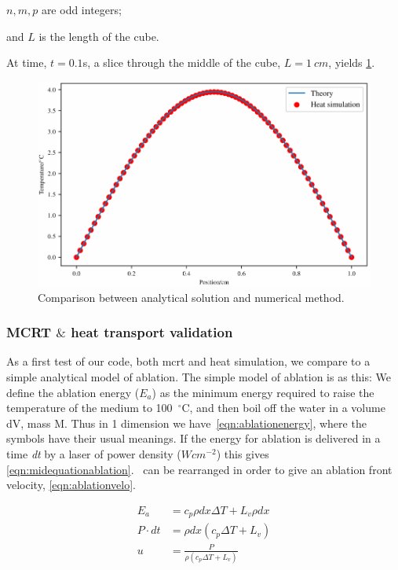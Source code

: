 	\indent $n,m,p$ are odd integers;
	
	\indent and $L$ is the length of the cube.
	
	\medskip
	
At time, $t=0.1$s, a slice through the middle of the cube, $L=1~cm$,  yields \cref{fig:validation-heat}.

\begin{figure}	
\vspace{-10pt}
	\centering
	\includegraphics[width=\columnwidth]{./ablation/images/validation.pdf}
	\caption{Comparison between analytical solution and numerical method.}
	\label{fig:validation-heat}
	\vspace{-10pt}
\end{figure}	

\subsubsection{MCRT $\&$ heat transport validation}

As a first test of our code, both \gls{mcrt} and heat simulation, we compare to a simple analytical model of ablation. The simple model of ablation is as this: We define the ablation energy ($E_a$) as the minimum energy required to raise the temperature of the medium to 100~$^{\circ}$C, and then boil off the water in a volume dV, mass M. Thus in 1 dimension we have~\cref{eqn:ablationenergy}, where the symbols have their usual meanings. If the energy for ablation is delivered in a time \textit{dt} by a laser of power density ($Wcm^{-2}$) this gives \cref{eqn:midequationablation}.~ can be rearranged in order to give an ablation front velocity, \cref{eqn:ablationvelo}.


\begin{align}
E_a &= c_p \rho dx \Delta T + L_v \rho dx \label{eqn:ablationenergy}\\
P\cdot dt &= \rho dx (c_p \Delta T + L_v) \label{eqn:midequationablation} \\
u &= \frac{P}{\rho(c_p\Delta T+ L_v)} \label{eqn:ablationvelo}
\end{align}

